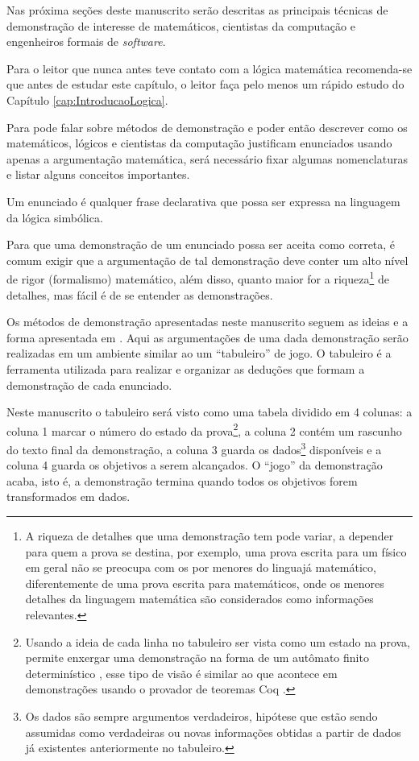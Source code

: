 Nas próxima seções deste manuscrito serão descritas as principais técnicas de demonstração de interesse de matemáticos, cientistas da computação e engenheiros formais de \textit{software}. 

\begin{remark}
    Para o leitor que nunca antes teve contato com a lógica matemática recomenda-se que antes de estudar este capítulo, o leitor faça pelo menos um rápido estudo do Capítulo \ref{cap:IntroducaoLogica}.
\end{remark}

Para pode falar sobre métodos de demonstração e poder então descrever como os matemáticos, lógicos e cientistas da computação justificam enunciados usando apenas a argumentação matemática, será necessário fixar algumas nomenclaturas e listar alguns conceitos importantes.

\begin{definition}[Enunciado]\label{def:Enunciado}
	Um enunciado é qualquer frase declarativa que possa ser expressa na linguagem da lógica simbólica.
\end{definition}

Para que uma demonstração de um enunciado possa ser aceita como correta, é comum exigir que a argumentação de tal demonstração deve conter um alto nível de rigor (formalismo) matemático, além disso, quanto maior for a riqueza\footnote{A riqueza de detalhes que uma demonstração tem pode variar, a depender para quem a prova se destina, por exemplo, uma prova escrita para um físico em geral não se preocupa com os por menores do linguajá matemático, diferentemente de uma prova escrita para matemáticos, onde os menores detalhes da linguagem matemática são considerados como informações relevantes.} de detalhes, mas fácil é de se entender as demonstrações.

Os métodos de demonstração apresentadas neste manuscrito seguem as ideias e a forma apresentada em \cite{velleman2019comProvar}. Aqui as argumentações de uma dada demonstração serão realizadas em um ambiente similar ao um ``tabuleiro'' de jogo. O tabuleiro é a ferramenta utilizada para realizar e organizar as deduções que formam a demonstração de cada enunciado. 

Neste manuscrito o tabuleiro será visto como uma tabela dividido em 4 colunas: a coluna 1 marcar o número do estado da prova\footnote{Usando a ideia de cada linha no tabuleiro ser vista como um estado na prova, permite enxergar uma demonstração na forma de um autômato finito determinístico \cite{hopcroft2008}, esse tipo de visão é similar ao que acontece em demonstrações usando o provador de teoremas Coq \cite{coq2013}.}, a coluna 2 contém um rascunho do texto final da demonstração, a coluna 3 guarda os dados\footnote{Os dados são sempre argumentos verdadeiros, hipótese que estão sendo assumidas como verdadeiras ou novas informações obtidas a partir de dados já existentes anteriormente no tabuleiro.} disponíveis e a coluna 4 guarda os objetivos a serem alcançados.  O ``jogo'' da demonstração acaba, isto é, a demonstração termina quando  todos os objetivos forem transformados em dados.

